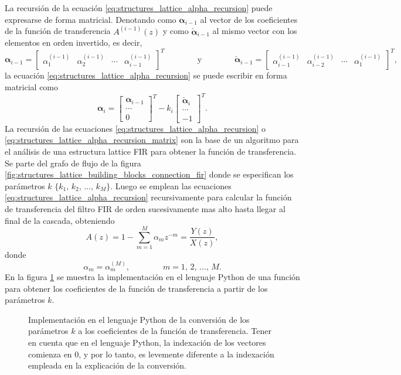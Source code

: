 \documentclass[a4paper]{report}
\newcommand{\alphabf}{\bm{\alpha}}
\begin{document}
La recursión de la ecuación \ref{eq:structures_lattice_alpha_recursion} puede expresarse de forma matricial. Denotando como \(\alphabf_{i-1}\) al vector de los coeficientes de la función de transferencia \(A^{(i-1)}(z)\) y como \(\check{\alphabf}_{i-1}\) al mismo vector con los elementos en orden invertido, es decir,
\[
 \alphabf_{i-1}=
 \begin{bmatrix}
  \alpha^{(i-1)}_1 & \alpha^{(i-1)}_2 & \cdots & \alpha^{(i-1)}_{i-1}
 \end{bmatrix}^T
 \qquad\qquad\textrm{y}\qquad\qquad
 \check{\alphabf}_{i-1}=
 \begin{bmatrix}
  \alpha^{(i-1)}_{i-1} & \alpha^{(i-1)}_{i-2} & \cdots & \alpha^{(i-1)}_{1}
 \end{bmatrix}^T,
\]
la ecuación \ref{eq:structures_lattice_alpha_recursion} se puede escribir en forma matricial como
\begin{equation}\label{eq:structures_lattice_alpha_recursion_matrix}
 \alphabf_{i}=
 \begin{bmatrix}
  \alphabf_{i-1} \\ \cdots \\ 0
 \end{bmatrix}^T
 -k_i 
  \begin{bmatrix}
  \check{\alphabf}_{i} \\ \cdots \\ -1
 \end{bmatrix}^T.
\end{equation}
La recursión de las ecuaciones \ref{eq:structures_lattice_alpha_recursion} o \ref{eq:structures_lattice_alpha_recursion_matrix} son la base de un algoritmo para el análisis de una estructura lattice FIR para obtener la función de transferencia. Se parte del grafo de flujo de la figura \ref{fig:structures_lattice_building_blocks_connection_fir} donde se especifican los parámetros \(k\) \(\{k_1,\,k_2,\,\dots,\,k_M\}\). Luego se emplean las ecuaciones \ref{eq:structures_lattice_alpha_recursion} recursivamente para calcular la función de transferencia del filtro FIR de orden sucesivamente mas alto hasta llegar al final de la cascada, obteniendo
\begin{equation}\label{eq:structures_lattice_AM_z_transform}
 A(z)=1-\sum_{m=1}^{M}\alpha_mz^{-m}=\frac{Y(z)}{X(z)},
\end{equation}
donde
\[
 \alpha_m=\alpha^{(M)}_m,
 \qquad\qquad 
 m=1,\,2,\,\dots,\,M.
\]
En la figura \ref{fig:structures_lattice_k_to_alpha} se muestra la implementación en el lenguaje Python de una función para obtener los coeficientes de la función de transferencia a partir de los parámetros \(k\).
\begin{figure}
\begin{center}

\caption{\label{fig:structures_lattice_k_to_alpha} Implementación en el lenguaje Python de la conversión de los parámetros \(k\) a los coeficientes de la función de transferencia. Tener en cuenta que en el lenguaje Python, la indexación de los vectores comienza en 0, y por lo tanto, es levemente diferente a la indexación empleada en la explicación de la conversión.}
\end{center}
\end{figure}
\end{document}
